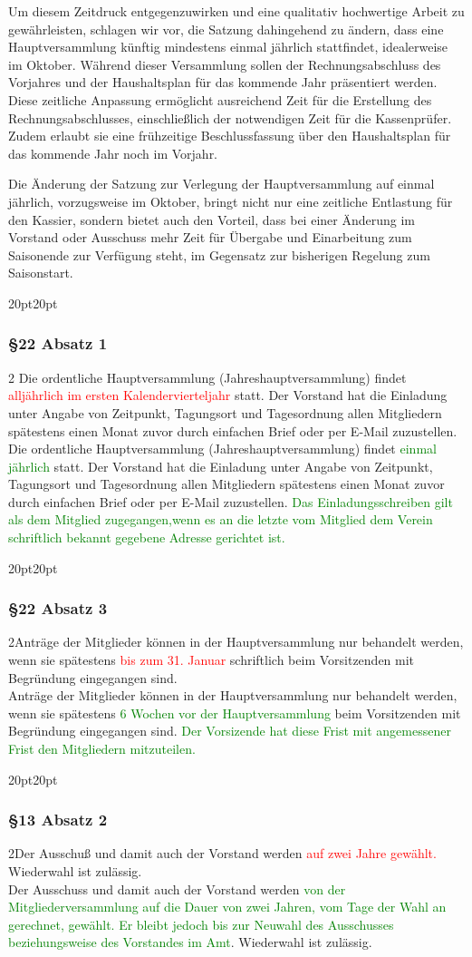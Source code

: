 \documentclass[10pt,a4paper,parskip=half]{scrartcl}
\newcommand{\new}[1]{\textcolor{Green}{#1}}
\newcommand{\old}[1]{\textcolor{Red}{#1}}
\newcommand{\change}[1]{
  \begin{adjustwidth}{20pt}{20pt}
    #1
  \end{adjustwidth}
}
\newcommand{\compare}[3]{\change{\subsubsection*{#1}\begin{multicols}{2}#2\columnbreak\\#3\end{multicols}}}
\begin{document}
  Um diesem Zeitdruck entgegenzuwirken und eine qualitativ hochwertige Arbeit zu gewährleisten, schlagen wir vor, die Satzung dahingehend zu ändern, dass eine Hauptversammlung künftig mindestens einmal jährlich stattfindet, idealerweise im Oktober. Während dieser Versammlung sollen der Rechnungsabschluss des Vorjahres und der Haushaltsplan für das kommende Jahr präsentiert werden. Diese zeitliche Anpassung ermöglicht ausreichend Zeit für die Erstellung des Rechnungsabschlusses, einschließlich der notwendigen Zeit für die Kassenprüfer. Zudem erlaubt sie eine frühzeitige Beschlussfassung über den Haushaltsplan für das kommende Jahr noch im Vorjahr.

  Die Änderung der Satzung zur Verlegung der Hauptversammlung auf einmal jährlich, vorzugsweise im Oktober, bringt nicht nur eine zeitliche Entlastung für den Kassier, sondern bietet auch den Vorteil, dass bei einer Änderung im Vorstand oder Ausschuss mehr Zeit für Übergabe und Einarbeitung zum Saisonende zur Verfügung steht, im Gegensatz zur bisherigen Regelung zum Saisonstart.
  
  \compare{§22 Absatz 1}{
    Die ordentliche Hauptversammlung (Jahreshauptversammlung) findet \old{alljährlich im ersten Kalendervierteljahr} statt.
    Der Vorstand hat die Einladung unter Angabe von Zeitpunkt,
    Tagungsort und Tagesordnung allen Mitgliedern spätestens einen Monat zuvor durch einfachen Brief oder per E-Mail zuzustellen.
  }{
    Die ordentliche Hauptversammlung (Jahreshauptversammlung) findet \new{einmal jährlich} statt.
    Der Vorstand hat die Einladung unter Angabe von Zeitpunkt,
    Tagungsort und Tagesordnung allen Mitgliedern spätestens einen Monat zuvor durch einfachen Brief oder per E-Mail zuzustellen.
    \new{Das Einladungsschreiben gilt als dem Mitglied zugegangen,wenn es an die letzte vom Mitglied dem Verein schriftlich bekannt gegebene Adresse gerichtet ist.}
  }

  \compare{§22 Absatz 3}{Anträge der Mitglieder können in der Haupt\-ver\-samm\-lung nur behandelt werden,
  wenn sie spätestens \old{bis zum 31. Januar} schriftlich beim Vorsitzenden mit Begründung eingegangen sind.}
  {Anträge der Mitglieder können in der Haupt\-ver\-samm\-lung nur behandelt werden,
  wenn sie spätestens \new{6 Wochen vor der Hauptversammlung} beim Vorsitzenden mit Begründung eingegangen sind.
  \new{Der Vorsizende hat diese Frist mit angemessener Frist den Mitgliedern mitzuteilen.}
  }

  \compare{§13 Absatz 2}
  {Der Ausschuß und damit auch der Vorstand werden \old{auf zwei Jahre gewählt.}
  Wiederwahl ist zulässig.}
  {Der Ausschuss und damit auch der Vorstand werden \new{von der Mitgliederversammlung auf die Dauer von zwei Jahren, vom Tage der Wahl an gerechnet, gewählt.
  Er bleibt jedoch bis zur Neuwahl des Ausschusses beziehungsweise des Vorstandes im Amt}.  Wiederwahl ist zulässig.}
\end{document}
